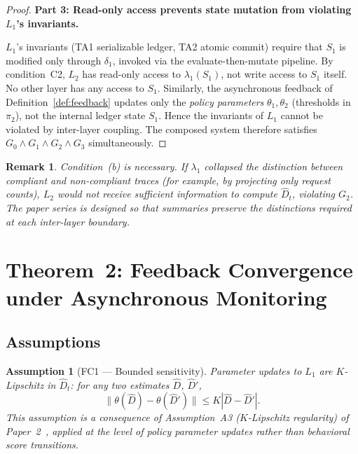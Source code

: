 \documentclass[11pt]{article}
\newtheorem{assumption}[theorem]{Assumption}
\newtheorem{remark}[theorem]{Remark}
\newcommand{\Dhat}{\widehat{D}}
\newcommand{\Layer}[1]{L_{#1}}
\newcommand{\State}[1]{S_{#1}}
\newcommand{\Trans}[1]{\delta_{#1}}
\newcommand{\Sum}[1]{\lambda_{#1}}
\begin{document}
\begin{proof}
\medskip
\noindent\textbf{Part 3: Read-only access prevents state mutation from
violating $\Layer{1}$'s invariants.}

$\Layer{1}$'s invariants (TA1 serializable ledger, TA2 atomic commit) require
that $\State{1}$ is modified only through $\Trans{1}$, invoked via the
evaluate-then-mutate pipeline. By condition~C2, $\Layer{2}$ has read-only
access to $\Sum{1}(\State{1})$, not write access to $\State{1}$ itself. No
other layer has any access to $\State{1}$. Similarly, the asynchronous
feedback of Definition~\ref{def:feedback} updates only the \emph{policy
parameters} $\theta_1, \theta_2$ (thresholds in $\pi_2$), not the internal
ledger state $\State{1}$. Hence the invariants of $\Layer{1}$ cannot be
violated by inter-layer coupling. The composed system therefore satisfies
$G_0 \wedge G_1 \wedge G_2 \wedge G_3$ simultaneously.
\end{proof}

\begin{remark}
Condition~(b) is necessary. If $\Sum{1}$ collapsed the distinction between
compliant and non-compliant traces (for example, by projecting only request
counts), $\Layer{2}$ would not receive sufficient information to compute
$\Dhat_t$, violating $G_2$. The paper series is designed so that summaries
preserve the distinctions required at each inter-layer boundary.
\end{remark}

\section{Theorem~2: Feedback Convergence under Asynchronous Monitoring}
\label{sec:thm2}

\subsection{Assumptions}

\begin{assumption}[FC1 --- Bounded sensitivity]
\label{ass:fc1}
Parameter updates to $\Layer{1}$ are $K$-Lipschitz in $\Dhat_t$: for any two
estimates $\Dhat$, $\Dhat'$,
\[
  \|\theta(\Dhat) - \theta(\Dhat')\| \le K|\Dhat - \Dhat'|.
\]
This assumption is a consequence of Assumption~A3 ($K$-Lipschitz regularity)
of Paper~2~\cite{fernandez2026c}, applied at the level of policy parameter
updates rather than behavioral score transitions.
\end{assumption}
\end{document}
